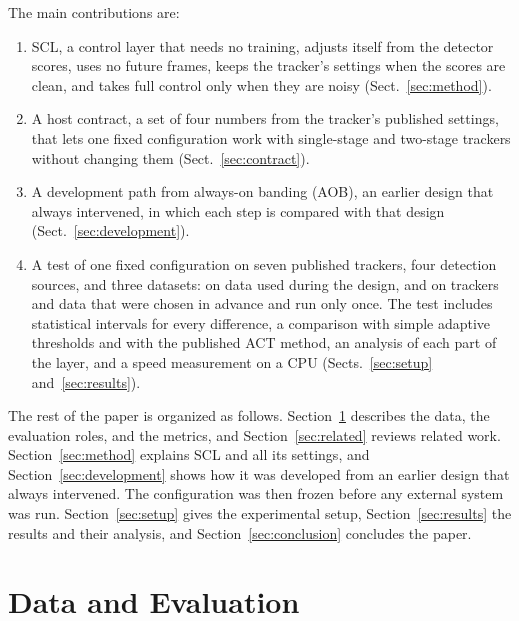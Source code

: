 \documentclass[pdflatex,sn-mathphys-num,iicol]{sn-jnl}
\newcommand{\scl}{SCL}
\newcommand{\aob}{AOB}
\begin{document}
The main contributions are:
\begin{enumerate}
\item \scl{}, a control layer that needs no training, adjusts itself from the
      detector scores, uses no future frames, keeps the tracker's settings
      when the scores are clean, and takes full control only when they are
      noisy (Sect.~\ref{sec:method}).
\item A host contract, a set of four numbers from the tracker's published
      settings, that lets one fixed configuration work with single-stage and
      two-stage trackers without changing them (Sect.~\ref{sec:contract}).
\item A development path from always-on banding (\aob{}), an earlier design
      that always intervened, in which each step is compared with that
      design (Sect.~\ref{sec:development}).
\item A test of one fixed configuration on seven published trackers, four
      detection sources, and three datasets: on data used during the design,
      and on trackers and data that were chosen in advance and run only once.
      The test includes statistical intervals for every difference, a
      comparison with simple adaptive thresholds and with the published ACT
      method, an analysis of each part of the layer, and a speed measurement
      on a CPU (Sects.~\ref{sec:setup} and~\ref{sec:results}).
\end{enumerate}

The rest of the paper is organized as follows. Section~\ref{sec:data-eval}
describes the data, the evaluation roles, and the metrics, and
Section~\ref{sec:related} reviews related work. Section~\ref{sec:method}
explains \scl{} and all its settings, and Section~\ref{sec:development} shows
how it was developed from an earlier design that always intervened. The
configuration was then frozen before any external system was run.
Section~\ref{sec:setup} gives the experimental setup,
Section~\ref{sec:results} the results and their analysis, and
Section~\ref{sec:conclusion} concludes the paper.
\section{Data and Evaluation}\label{sec:data-eval}
\end{document}
